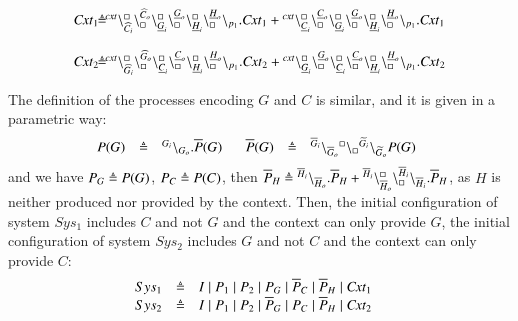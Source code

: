 \[
\begin{array}{l@{\hspace{-0.03cm}}c@{\hspace{-0.03cm}}l}
\mathit{Cxt}_1 & \defeq &\startchain{\mathit{cxt}}\chainedlink{\widehat{C}_i}{\noact}\chainedlink{\noact}{\widehat{C}_o}\chainedlink{\underline{G}_i}{\noact}\chainedlink{\noact}{\underline{G}_o}
\chainedlink{\underline{H}_i}{\noact}\chainedlink{\noact}{\underline{H}_o}\chainend{p_1}.\mathit{Cxt}_1 			                      +
                              \startchain{\mathit{cxt}}\chainedlink{\underline{C}_i}{\noact}\chainedlink{\noact}{\underline{C}_o}\chainedlink{\underline{G}_i}{\noact}\chainedlink{\noact}{\underline{G}_o}\chainedlink{\underline{H}_i}{\noact}\chainedlink{\noact}{\underline{H}_o}\chainend{p_1}.\mathit{Cxt}_1 \\
                              \\
                              \mathit{Cxt}_2 & \defeq &\startchain{\mathit{cxt}}\chainedlink{\widehat{G}_i}{\noact}\chainedlink{\noact}{\widehat{G}_o}\chainedlink{\underline{C}_i}{\noact}\chainedlink{\noact}{\underline{C}_o}\chainedlink{\underline{H}_i}{\noact}\chainedlink{\noact}{\underline{H}_o}\chainend{p_1}.\mathit{Cxt}_2 	                      +
                              \startchain{\mathit{cxt}}\chainedlink{\underline{G}_i}{\noact}\chainedlink{\noact}{\underline{G}_o}\chainedlink{\underline{C}_i}{\noact}\chainedlink{\noact}{\underline{C}_o}\chainedlink{\underline{H}_i}{\noact}\chainedlink{\noact}{\underline{H}_o}\chainend{p_1}.\mathit{Cxt}_2
\end{array}
\]

The definition of the processes encoding $G$ and $C$ is similar, and it is given in a parametric way:
\[
\begin{array}{lcl @{\hspace{0.5cm}}lcl}
P(G) &\defeq&\link{G_i}{G_o}.\overline{P}(G)\   & \overline{P}(G)&\defeq&\link{\overline{G}_i}{\overline{G}_o} \link{\noact}{\noact}\link{\widetilde{G}_i}{\widetilde{G}_o}P(G) \ \ 			                      
\end{array}
\]
and we have $P_G \triangleq P(G)$, $P_C \triangleq P(C)$,  then $\overline{P}_H \triangleq {}^{\overline{H}_i} \backslash_{\overline{H}_o}.\overline{P}_H + {}^{\overline{H}_i}\backslash_{\overline{H}_o}^{\scriptstyle {\square}}\backslash_{\scriptstyle {\square}}^{\overline{H}_i}\backslash_{\overline{H}_i}.\overline{P}_H$, as $H$ is neither produced nor provided by the context.
Then, the initial configuration of system $Sys_1$ includes $C$ and not $G$ and the context can only provide $G$,
the initial configuration of system $Sys_2$ includes $G$ and not $C$ and the context can only provide $C$:
\[
\begin{array}{lcl@{\hspace{0.5cm}}lcl}
Sys_1 & \defeq & I\mid  P_1 \mid P_2 \mid P_G \mid \overline{P}_C \mid \overline{P}_H\mid \mathit{Cxt}_1 \\
Sys_2 & \defeq & I \mid P_1 \mid P_2 \mid \overline{P}_G \mid P_C \mid \overline{P}_H\mid \mathit{Cxt}_2\\
\end{array}
\]



